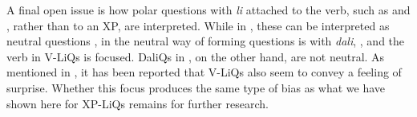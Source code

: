 \documentclass[output=paper,
colorlinks,
citecolor=brown,
newtxmath
]{langscibook}
\begin{document}
A final open issue is how polar questions with \textit{li} attached to the verb, such as  and , rather than to an XP, are interpreted. While in , these can be interpreted as neutral questions \citep{Rudin.Kramer.Billings.Baerman1999, dukova2010}, in  the neutral way of forming questions is with \textit{dali}, , and the verb in V-LiQs is focused. DaliQs in , on the other hand, are not neutral. As mentioned in , it has been reported that V-LiQs also seem to convey a feeling of surprise. Whether this focus produces the same type of bias as what we have shown here for XP-LiQs remains for further research.




\end{document}

